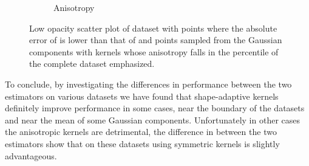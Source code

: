 \begin{figure}
\begin{subfigure}{0.23\textwidth}
				\caption{Anisotropy}
				\label{fig:discussion:ferdosi3Noise:anisotropy}
			\end{subfigure}			
			\caption{Low opacity scatter plot of dataset \ferdosiThreeNoise with %
				 points where the absolute error of \mbe is lower than that of \sambe and %
				 points sampled from the Gaussian components with kernels whose anisotropy falls in the  percentile of the complete dataset emphasized.}
			\label{fig:discussion:ferdosi3Noise}
		\end{figure}		

To conclude, by investigating the differences in performance between the two estimators on various datasets we have found that shape-adaptive kernels definitely improve performance in some cases, \eg near the boundary of the datasets and near the mean of some Gaussian components. Unfortunately in other cases the anisotropic kernels are detrimental, the difference in \mse between the two estimators show that on these datasets using symmetric kernels is slightly advantageous. 
